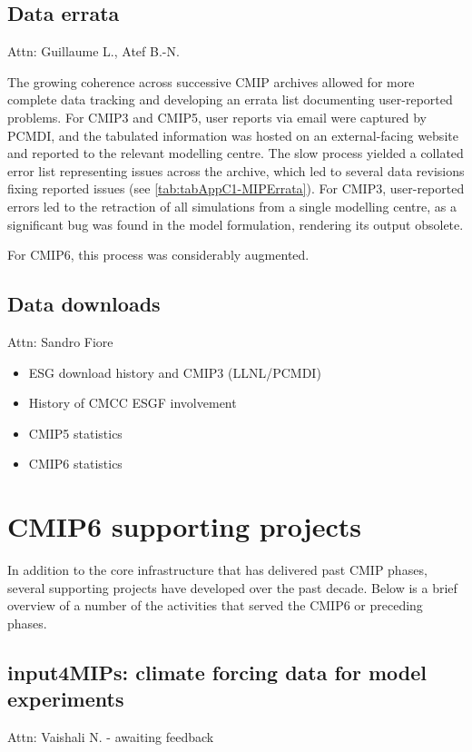 \documentclass[gmd, preprint]{copernicus}
\def\cred#1{{\color{red}#1}}
\begin{document}
\subsection{Data errata}
\cred{Attn: Guillaume L., Atef B.-N.}

The growing coherence across successive CMIP archives allowed for more complete data tracking and developing an errata list documenting user-reported problems. For CMIP3 and CMIP5, user reports via email were captured by PCMDI, and the tabulated information was hosted on an external-facing website and reported to the relevant modelling centre. The slow process yielded a collated error list representing issues across the archive, which led to several data revisions fixing reported issues (see \autoref{tab:tabAppC1-MIPErrata}). For CMIP3, user-reported errors led to the retraction of all simulations from a single modelling centre, as a significant bug was found in the model formulation, rendering its output obsolete.

\cred{For CMIP6, this process was considerably augmented.}


\subsection{Data downloads}
\cred{Attn: Sandro Fiore}
\cred{
\begin{itemize}
	\item ESG download history and CMIP3 (LLNL/PCMDI)
    \item History of CMCC ESGF involvement
	\item CMIP5 statistics
	\item CMIP6 statistics
\end{itemize}
}


\section{CMIP6 supporting projects}
\label{sec:CMIP6SupportingProjects}
In addition to the core infrastructure that has delivered past CMIP phases, several supporting projects have developed over the past decade. Below is a brief overview of a number of the activities that served the CMIP6 or preceding phases.


\subsection{input4MIPs: climate forcing data for model experiments}
\label{sec:input4MIPs}
\cred{Attn: Vaishali N. - awaiting feedback}
\end{document}
